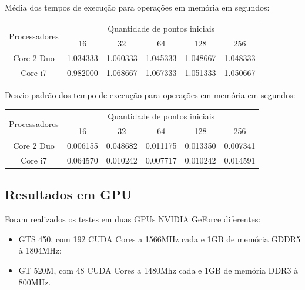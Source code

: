     \noindent Média dos tempos de execução para operações em memória em segundos:\\
    \begin{scriptsize}
    \begin{tabular}{| c | c | c | c | c | c |}
      \hline
      \multirow{2}{*}{Processadores}& \multicolumn{5}{|c|}{Quantidade de pontos iniciais} \\ \cline{2-6}
      & 16 & 32 & 64 & 128 & 256 \\ \hline
      Core 2 Duo & 1.034333 & 1.060333 & 1.045333 & 1.048667 & 1.048333 \\ \hline
      Core i7 & 0.982000 & 1.068667 & 1.067333 & 1.051333 & 1.050667\\ \hline

      \hline
    \end{tabular}
    \end{scriptsize}
    
    \hspace{1mm}\newline
    
    \noindent Desvio padrão dos tempo de execução para operações em memória em segundos:\\
    \begin{scriptsize}
    \begin{tabular}{| c | c | c | c | c | c |}
      \hline
      \multirow{2}{*}{Processadores}& \multicolumn{5}{|c|}{Quantidade de pontos iniciais} \\ \cline{2-6}
      & 16 & 32 & 64 & 128 & 256 \\ \hline
      Core 2 Duo & 0.006155 & 0.048682 & 0.011175 & 0.013350 & 0.007341 \\ \hline
      Core i7 & 0.064570 & 0.010242 & 0.007717 & 0.010242 & 0.014591 \\ \hline

      \hline
    \end{tabular}
    \end{scriptsize}

  \subsection{Resultados em GPU}
    Foram realizados os testes em duas GPUs NVIDIA GeForce diferentes:
  \begin{itemize}
    \item GTS 450, com 192 CUDA Cores a 1566MHz cada e 1GB de memória GDDR5 à 1804MHz;
    \item GT 520M, com 48 CUDA Cores a 1480Mhz cada e 1GB de memória DDR3 à 800MHz.
  \end{itemize}
  
